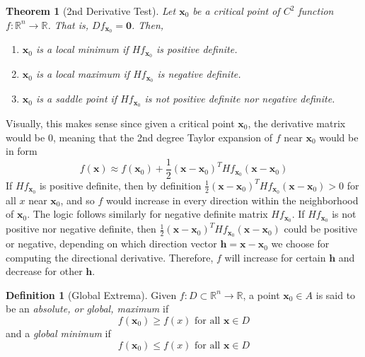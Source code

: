 \documentclass{article}
\newtheorem{theorem}{Theorem}[section]
\theoremstyle{remark}
\theoremstyle{definition}
\newtheorem{definition}{Definition}[section]
\begin{document}
\begin{theorem}[2nd Derivative Test]
Let $\mathbf{x}_0$ be a critical point of $C^2$ function $f: \mathbb{R}^n \longrightarrow \mathbb{R}$. That is, $D f_{\mathbf{x}_0} = \mathbf{0}$. Then, 
\begin{enumerate}
    \item $\mathbf{x}_0$ is a local minimum if $H f_{\mathbf{x}_0}$ is positive definite.
    \item $\mathbf{x}_0$ is a local maximum if $H f_{\mathbf{x}_0}$ is negative definite. \item $\mathbf{x}_0$ is a \textit{saddle point} if $H f_{\mathbf{x}_0}$ is not positive definite nor negative definite. 
\end{enumerate}

\end{theorem}

Visually, this makes sense since given a critical point $\mathbf{x}_0$, the derivative matrix would be $0$, meaning that the 2nd degree Taylor expansion of $f$ near $\mathbf{x}_0$ would be in form
\[f(\mathbf{x}) \approx f(\mathbf{x}_0) + \frac{1}{2} (\mathbf{x} - \mathbf{x}_0)^T H f_{\mathbf{x}_0} (\mathbf{x} - \mathbf{x}_0)\]
If $H f_{\mathbf{x}_0}$ is positive definite, then by definition $\frac{1}{2} (\mathbf{x} - \mathbf{x}_0)^T H f_{\mathbf{x}_0} (\mathbf{x} - \mathbf{x}_0) > 0$ for all $x$ near $\mathbf{x}_0$, and so $f$ would increase in every direction within the neighborhood of $\mathbf{x}_0$. The logic follows similarly for negative definite matrix $H f_{\mathbf{x}_0}$. If $H f_{\mathbf{x}_0}$ is not positive nor negative definite, then $\frac{1}{2} (\mathbf{x} - \mathbf{x}_0)^T H f_{\mathbf{x}_0} (\mathbf{x} - \mathbf{x}_0)$ could be positive or negative, depending on which direction vector $\mathbf{h} = \mathbf{x} - \mathbf{x}_0$ we choose for computing the directional derivative. Therefore, $f$ will increase for certain $\mathbf{h}$ and decrease for other $\mathbf{h}$. 

\begin{definition}[Global Extrema]
Given $f: D \subset \mathbb{R}^n \longrightarrow \mathbb{R}$, a point $\mathbf{x}_0 \in A$ is said to be an \textit{absolute, or global, maximum} if 
\[f(\mathbf{x}_0) \geq f(x) \text{ for all } \mathbf{x} \in D\]
and a \textit{global minimum} if 
\[f(\mathbf{x}_0) \leq f(x) \text{ for all } \mathbf{x} \in D\]
\end{definition}
\end{document}

